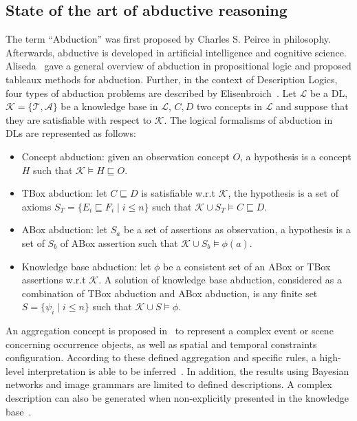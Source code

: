 \documentclass{article}
\begin{document}
\subsection{State of the art of abductive reasoning}
The term ``Abduction'' was first proposed by Charles S. Peirce in philosophy.
Afterwards, abductive is developed in artificial intelligence and cognitive science.
Aliseda~\cite{aliseda1997seeking} gave a general overview of abduction in propositional logic and proposed tableaux methods for abduction.
Further, in the context of Description Logics, four types of abduction problems  are described by Elisenbroich~\cite{elsenbroich2006case}.
Let $\mathcal{L}$ be a DL, $\mathcal{K}=\{\mathcal{T},\mathcal{A}\}$ be a knowledge base in $\mathcal{L}$, $C,D$ two concepts in $\mathcal{L}$ and suppose that they are satisfiable
with respect to  $\mathcal{K}$.
The logical formalisms of abduction in DLs are represented as follows:
\begin{itemize}
 \item Concept abduction: given an observation concept $O$, a hypothesis is a concept $H$ such that $\mathcal{K}\vDash H \sqsubseteq O$.
 \item TBox abduction: let $C\sqsubseteq D$ is satisfiable w.r.t $\mathcal{K}$, the hypothesis is a set of axioms $S_T=\{E_i\sqsubseteq F_i \mid i\leq n\}$
 such that $ \mathcal{K}\cup S_T\vDash C\sqsubseteq D$.
 \item ABox abduction: let $S_a$ be a set of assertions as observation, a hypothesis is a set of $S_b$ of ABox assertion such that $\mathcal{K} \cup S_b\vDash \phi(a)$.
 \item Knowledge base abduction: let $\phi$ be a consistent set of an ABox or TBox assertions w.r.t $\mathcal{K}$. A solution of knowledge base abduction, considered 
 as a combination of TBox abduction and ABox abduction, is any finite set $S=\{\psi_i \mid i\leq n\}$ such that $ \mathcal{K} \cup S \vDash \phi$.
\end{itemize}

An aggregation concept is proposed in~\cite{Espinosa07multimedia} to represent a complex event or scene concerning occurrence objects, as well as spatial and temporal constraints configuration.
According to these defined aggregation and specific rules, a high-level interpretation is able to be inferred~\cite{neumann2008scene}.
In addition, the results using Bayesian networks and image grammars are limited to defined descriptions.
A complex description can also be generated when non-explicitly presented in the knowledge base~\cite{atif2014explanatory}.
\end{document}
